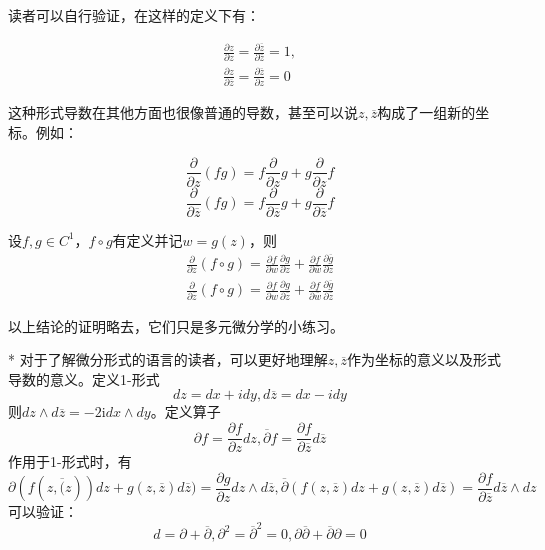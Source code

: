 读者可以自行验证，在这样的定义下有：\begin{proposition}
    \begin{align*}
        \frac{\partial z}{\partial z}=\frac{\partial \overline{z}}{\partial \overline{z}}=1,\\
        \frac{\partial z}{\partial \overline{z}}=\frac{\partial \overline{z}}{\partial z}=0
    \end{align*}
\end{proposition}

这种形式导数在其他方面也很像普通的导数，甚至可以说$z,\overline{z}$构成了一组新的坐标。例如：
\begin{theorem}[莱布尼兹法则]
    \[\frac{\partial}{\partial z}(fg)=f\frac{\partial}{\partial z}g+g\frac{\partial}{\partial z}f\]
    \[\frac{\partial}{\partial \overline{z}}(fg)=f\frac{\partial}{\partial \overline{z}}g+g\frac{\partial}{\partial \overline{z}}f\]
\end{theorem}
\begin{theorem}[链式法则]
    设$f,g\in C^1$，$f\circ g$有定义并记$w=g(z)$，则
    \begin{align*}
        \frac{\partial}{\partial z}(f\circ g)=\frac{\partial f}{\partial w}\frac{\partial g}{\partial z}+\frac{\partial f}{\partial \overline{w}}\frac{\partial\overline{g}}{\partial z}\\
        \frac{\partial}{\partial \overline{z}}(f\circ g)=\frac{\partial f}{\partial w}\frac{\partial g}{\partial \overline{z}}+\frac{\partial f}{\partial \overline{w}}\frac{\partial\overline{g}}{\partial \overline{z}}
    \end{align*}
\end{theorem}
以上结论的证明略去，它们只是多元微分学的小练习。
\begin{remark}*
    对于了解微分形式的语言的读者，可以更好地理解$z,\overline{z}$作为坐标的意义以及形式导数的意义。定义1-形式\cite{shijihuai}
    $$dz=dx+idy,d\overline{z}=dx-idy$$
    则$dz\wedge d\overline{z}=-2\mathrm{i} dx\wedge dy$。定义算子
    $$\partial f=\frac{\partial f}{\partial z}dz,\overline{\partial} f=\frac{\partial f}{\partial \overline{z}}d\overline{z}$$
    作用于1-形式时，有
    $$\partial(f(z,\overline(z))dz+g(z,\overline{z})d\overline{z})=\frac{\partial g}{\partial z}dz\wedge d\overline{z},\overline{\partial}(f(z,\overline{z})dz+g(z,\overline{z})d\overline{z})=\frac{\partial f}{\partial \overline{z}}d\overline{z}\wedge dz$$
    可以验证：$$d=\partial+\overline{\partial},\partial^2=\overline{\partial}^2=0,\partial\overline{\partial}+\overline{\partial}\partial=0$$
\end{remark}
